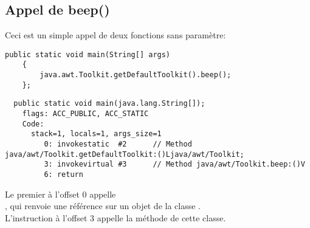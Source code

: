 \subsection{Appel de beep()}

Ceci est un simple appel de deux fonctions sans paramètre:


\begin{lstlisting}[style=customjava]
	public static void main(String[] args)
	{
		java.awt.Toolkit.getDefaultToolkit().beep();
	};
\end{lstlisting}

\begin{lstlisting}
  public static void main(java.lang.String[]);
    flags: ACC_PUBLIC, ACC_STATIC
    Code:
      stack=1, locals=1, args_size=1
         0: invokestatic  #2      // Method java/awt/Toolkit.getDefaultToolkit:()Ljava/awt/Toolkit;
         3: invokevirtual #3      // Method java/awt/Toolkit.beep:()V
         6: return        
\end{lstlisting}

Le premier  à l'offset 0 appelle\\
,
qui renvoie une référence sur un objet de la classe .\\
L'instruction  à l'offset 3 appelle la méthode  de cette
classe.

